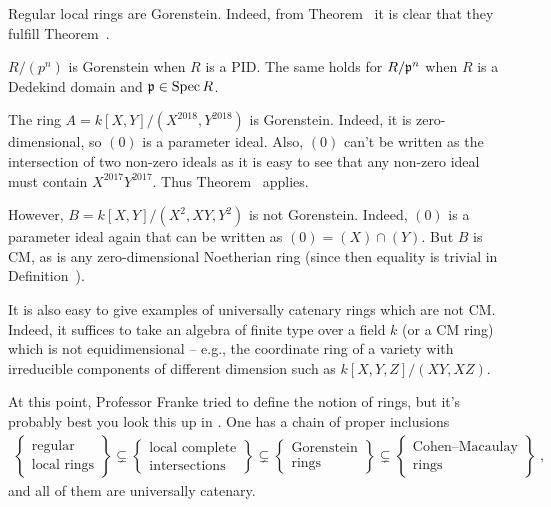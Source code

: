 \documentclass[a4paper,parskip=half,numbers=enddot, DIV=12]{scrreprt}
\begin{document}
\begin{example*}
	\begin{alphanumerate}
		\item Regular local rings are Gorenstein. Indeed, from Theorem~ it is clear that they fulfill Theorem~.
		\item $R/(p^n)$ is Gorenstein when $R$ is a PID. The same holds for $R/\mathfrak{p}^n$ when $R$ is a Dedekind domain and $\mathfrak{p}\in\operatorname{Spec} R$.
		\item The ring $A=k[X,Y]/(X^{2018},Y^{2018})$ is Gorenstein. Indeed, it is zero-dimensional, so $(0)$ is a parameter ideal. Also, $(0)$ can't be written as the intersection of two non-zero ideals as it is easy to see that any non-zero ideal must contain $X^{2017}Y^{2017}$. Thus Theorem~ applies.
		
		However, $B=k[X,Y]/(X^2,XY,Y^2)$ is not Gorenstein. Indeed, $(0)$ is a parameter ideal again that can be written as $(0)=(X)\cap (Y)$. But $B$ is CM, as is any zero-dimensional Noetherian ring (since then equality is trivial in Definition~).
		
		It is also easy to give examples of universally catenary rings which are not CM. Indeed, it suffices to take an algebra of finite type over a field $k$ (or a CM ring) which is not equidimensional -- e.g., the coordinate ring of a variety with irreducible components of different dimension such as $k[X,Y,Z]/(XY,XZ)$.
	\end{alphanumerate}
\end{example*}
At this point, Professor Franke tried to define the notion of  rings, but it's probably best you look this up in \cite[\S 21]{matsumuraCRT}. One has a chain of proper inclusions
\begin{align*}
	\left\{\begin{array}{c}
		\text{regular}\\
		\text{local rings}
	\end{array}\right\}\subsetneq 
	\left\{\begin{array}{c}
	\text{local complete}\\
	\text{intersections}
	\end{array}\right\}\subsetneq
	\left\{\begin{array}{c}
	\text{Gorenstein}\\
	\text{rings}
	\end{array}\right\}\subsetneq
	\left\{\begin{array}{c}
	\text{Cohen--Macaulay}\\
	\text{rings}
	\end{array}\right\}\;,
\end{align*}
and all of them are universally catenary.
\end{document}
